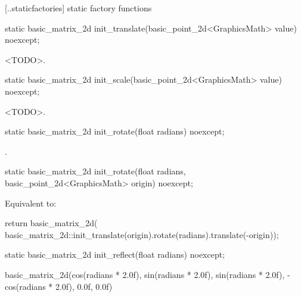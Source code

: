 [\iotwod.\matrixtwod.staticfactories] { static factory 
functions}

%
\begin{itemdecl}
static basic_matrix_2d init_translate(basic_point_2d<GraphicsMath> value) noexcept;
\end{itemdecl}
\begin{itemdescr}
\pnum
\returns
<TODO>.
\end{itemdescr}

%
\begin{itemdecl}
static basic_matrix_2d init_scale(basic_point_2d<GraphicsMath> value) noexcept;
\end{itemdecl}
\begin{itemdescr}
\pnum
\returns
<TODO>.
\end{itemdescr}

%
\begin{itemdecl}
static basic_matrix_2d init_rotate(float radians) noexcept;
\end{itemdecl}
\begin{itemdescr}
\pnum
\returns
{}.
\end{itemdescr}

%
\begin{itemdecl}
static basic_matrix_2d init_rotate(float radians, basic_point_2d<GraphicsMath> origin) noexcept;
\end{itemdecl}
\begin{itemdescr}
\pnum
\effects
Equivalent to:
\begin{codeblock}
return basic_matrix_2d(
  basic_matrix_2d::init_translate(origin).rotate(radians).translate(-origin));
\end{codeblock}
\end{itemdescr}

%
\begin{itemdecl}
static basic_matrix_2d init_reflect(float radians) noexcept;
\end{itemdecl}
\begin{itemdescr}
\pnum
\returns
\tcode
{basic_matrix_2d(cos(radians * 2.0f), sin(radians * 2.0f), sin(radians * 2.0f),
  -cos(radians * 2.0f), 0.0f, 0.0f)}
\end{itemdescr}

